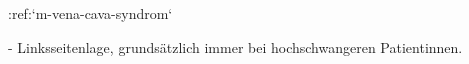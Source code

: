 :ref:`m-vena-cava-syndrom`
\begin{itemize}
    -   Linksseitenlage, grundsätzlich immer bei
    hochschwangeren Patientinnen.
\end{itemize}